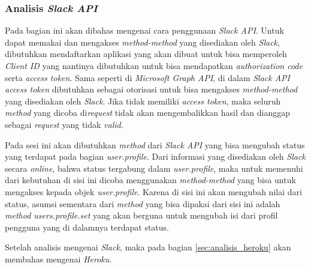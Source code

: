 \subsubsection{Analisis \textit{Slack API}}
\label{sec:analisis_slack_api}
Pada bagian ini akan dibahas mengenai cara penggunaan \textit{Slack API}. Untuk dapat memakai dan mengakses \textit{method-method} yang disediakan oleh \textit{Slack}, dibutuhkan mendaftarkan aplikasi yang akan dibuat untuk bisa memperoleh \textit{Client ID} yang nantinya dibutuhkan untuk bisa mendapatkan \textit{authorization code} serta \textit{access token}. Sama seperti di \textit{Microsoft Graph API}, di dalam \textit{Slack API access token} dibutuhkan sebagai otorisasi untuk bisa mengakses \textit{method-method} yang disediakan oleh \textit{Slack}. Jika tidak memiliki \textit{access token}, maka seluruh \textit{method} yang dicoba di\textit{request} tidak akan mengembalikkan hasil dan dianggap sebagai \textit{request} yang tidak \textit{valid}. 

Pada sesi ini akan dibutuhkan \textit{method} dari \textit{Slack API} yang bisa mengubah status yang terdapat pada bagian \textit{user.profile}. Dari informasi yang disediakan oleh \textit{Slack} secara \textit{online}, bahwa status tergabung dalam \textit{user.profile}, maka untuk memenuhi dari kebutuhan di sisi ini dicoba menggunakan \textit{method-method} yang bisa untuk mengakses kepada objek \textit{user.profile}. Karena di sisi ini akan mengubah nilai dari status, asumsi sementara dari \textit{method} yang bisa dipakai dari sisi ini adalah \textit{method users.profile.set} yang akan berguna untuk mengubah isi dari profil pengguna yang di dalamnya terdapat status. 

Setelah analisis mengenai \textit{Slack}, maka pada bagian \ref{sec:analisis_heroku} akan membahas mengenai \textit{Heroku}. 

